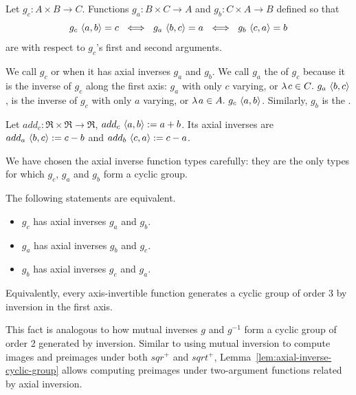 \begin{definition}
\label{def:axial-inverse}
Let $g_c : A \times B \to C$.
Functions $g_a : B \times C \to A$ and $g_b : C \times A \to B$ defined so that
\begin{equation}
	g_c~\pair{a,b} = c\ \iff\ g_a~\pair{b,c} = a\ \iff\ g_b~\pair{c,a} = b
\end{equation}
are  with respect to $g_c$'s first and second arguments.
\end{definition}

We call $g_c$  or  when it has axial inverses $g_a$ and $g_b$.
We call $g_a$ the  of $g_c$ because it is the inverse of $g_c$ along the first axis: $g_a$ with only $c$ varying, or $\lambda\mspace{2mu}{c \in C}\ldotp\, g_a~\langle{b,c}\rangle$, is the inverse of $g_c$ with only $a$ varying, or $\lambda\mspace{2mu}{a \in A}\ldotp\, g_c~\langle{a,b}\rangle$.
Similarly, $g_b$ is the .

\begin{example}
\label{ex:plus-axial-inverses}
Let $add_c : \Re \times \Re \to \Re$, $add_c~\langle{a,b}\rangle := a+b$.
Its axial inverses are $add_a~\langle{b,c}\rangle := c - b$ and $add_b~\langle{c,a}\rangle := c - a$.
\exampleqed
\end{example}

We have chosen the axial inverse function types carefully: they are the only types for which $g_c$, $g_a$ and $g_b$ form a cyclic group.

\begin{lemma}
\label{lem:axial-inverse-cyclic-group}
The following statements are equivalent.
\begin{itemize}
	\item $g_c$ has axial inverses $g_a$ and $g_b$.
	\item $g_a$ has axial inverses $g_b$ and $g_c$.
	\item $g_b$ has axial inverses $g_c$ and $g_a$.
\end{itemize}
Equivalently, every axis-invertible function generates a cyclic group of order 3 by inversion in the first axis.
\end{lemma}

This fact is analogous to how mutual inverses $g$ and $g^{-1}$ form a cyclic group of order 2 generated by inversion.
Similar to using mutual inversion to compute images and preimages under both $sqr^+$ and $sqrt^+$, Lemma~\ref{lem:axial-inverse-cyclic-group} allows computing preimages under two-argument functions related by axial inversion.


